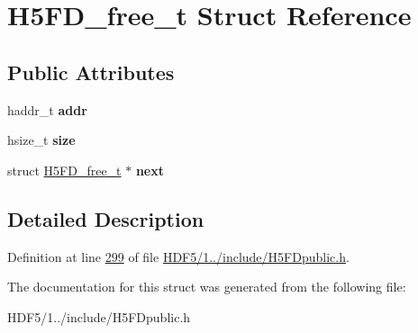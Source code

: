 \hypertarget{struct_h5_f_d__free__t}{}\section{H5\+F\+D\+\_\+free\+\_\+t Struct Reference}
\label{struct_h5_f_d__free__t}
\subsection*{Public Attributes}
\begin{DoxyCompactItemize}
\item 
\mbox{\label{struct_h5_f_d__free__t_a02b4cbfaa88537ed0a96213a52ace496}} 
haddr\+\_\+t {\bfseries addr}
\item 
\mbox{\label{struct_h5_f_d__free__t_acc3fc8705e67848adb8f93862870e11b}} 
hsize\+\_\+t {\bfseries size}
\item 
\mbox{\label{struct_h5_f_d__free__t_af229a0b04a86fc1e6e800fdf2c2ea3cc}} 
struct \hyperlink{struct_h5_f_d__free__t}{H5\+F\+D\+\_\+free\+\_\+t} $\ast$ {\bfseries next}
\end{DoxyCompactItemize}


\subsection{Detailed Description}


Definition at line \hyperlink{_h_d_f5_21_810_81_2include_2_h5_f_dpublic_8h_source_l00299}{299} of file \hyperlink{_h_d_f5_21_810_81_2include_2_h5_f_dpublic_8h_source}{H\+D\+F5/1../include/\+H5\+F\+Dpublic.\+h}.



The documentation for this struct was generated from the following file\+:\begin{DoxyCompactItemize}
\item 
H\+D\+F5/1../include/\+H5\+F\+Dpublic.\+h\end{DoxyCompactItemize}
